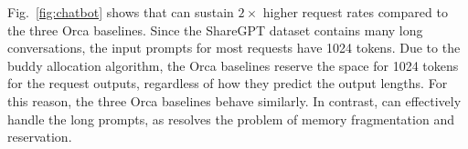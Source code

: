 Fig.~\ref{fig:chatbot} shows that \sys can sustain $2\times$ higher request rates compared to the three Orca baselines.
Since the ShareGPT dataset contains many long conversations, the input prompts for most requests have 1024 tokens.
Due to the buddy allocation algorithm, the Orca baselines reserve the space for 1024 tokens for the request outputs, regardless of how they predict the output lengths.
For this reason, the three Orca baselines behave similarly.
In contrast, \sys can effectively handle the long prompts, as \tech resolves the problem of memory fragmentation and reservation.
